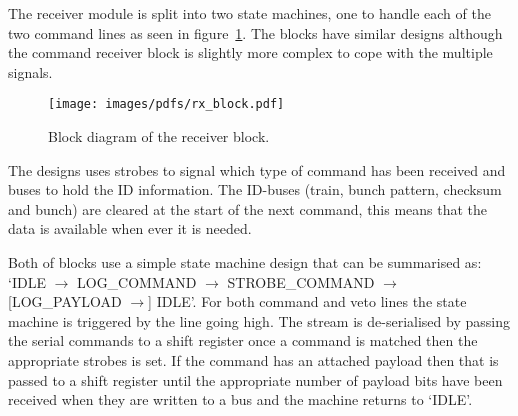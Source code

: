 \documentclass[]{article}
\begin{document}
    The receiver module is split into two state machines, one to handle each of the two command lines as seen in figure~\ref{fig:rx_block}. The blocks have similar designs although the command receiver block is slightly more complex to cope with the multiple signals. 
    \begin{figure}[htbp] 
        \centering
        \texttt{[image: images/pdfs/rx\_block.pdf]}
        \caption{Block diagram of the receiver block.}
        \label{fig:rx_block}
    \end{figure}
  
    The designs uses strobes to signal which type of command has been received and buses to hold the ID information. The ID-buses (train, bunch pattern, checksum and bunch) are cleared at the start of the next command, this means that the data is available when ever it is needed.
  
    Both of blocks use a simple state machine design that can be summarised as: `IDLE \( \rightarrow \) LOG\_COMMAND \( \rightarrow \) STROBE\_COMMAND \( \rightarrow \) [LOG\_PAYLOAD \( \rightarrow \)] IDLE'. For both command and veto lines the state machine is triggered by the line going high. The stream is de-serialised by passing the serial commands to a shift register once a command is matched then the appropriate strobes is set. If the command has an attached payload then that is passed to a shift register until the appropriate number of payload bits have been received when they are written to a bus and the machine returns to `IDLE'.
\end{document}
